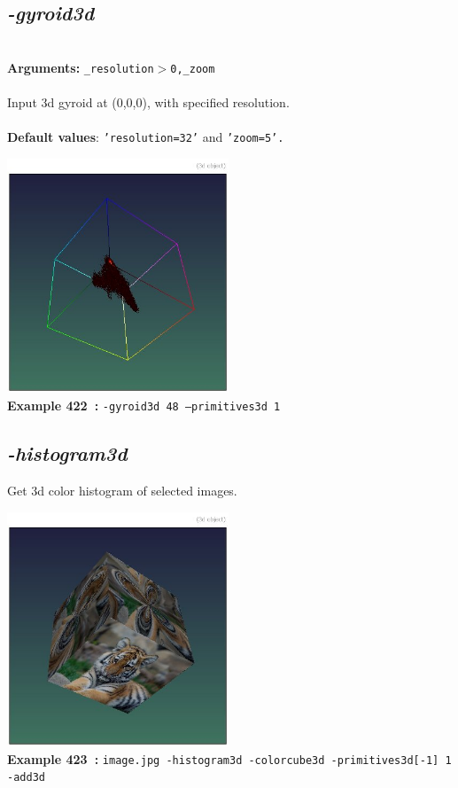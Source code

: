 \documentclass[a4paper,11pt,twoside]{book}
\begin{document}
\subsection{\emph{-gyroid3d} }\vspace*{-0.5em}
~\\\textbf{Arguments: } 
{\small \texttt{\_resolution$>$0,\_zoom}}\\~\\
Input 3d gyroid at (0,0,0), with specified resolution.
~\\~\\\textbf{Default values}: {\small \texttt{'resolution=32'} and \texttt{'zoom=5'.}}
\begin{center}\includegraphics[keepaspectratio=true,height=7cm,width=\textwidth]{img/gmic_def422.jpg}\\
{\footnotesize \textbf{Example 422~:} \texttt{-gyroid3d 48 --primitives3d 1}}
\end{center}

\subsection{\emph{-histogram3d} }\vspace*{-0.5em}
Get 3d color histogram of selected images.
\begin{center}\includegraphics[keepaspectratio=true,height=7cm,width=\textwidth]{img/gmic_def423.jpg}\\
{\footnotesize \textbf{Example 423~:} \texttt{image.jpg -histogram3d -colorcube3d -primitives3d[-1] 1 -add3d}}
\end{center}
\end{document}
